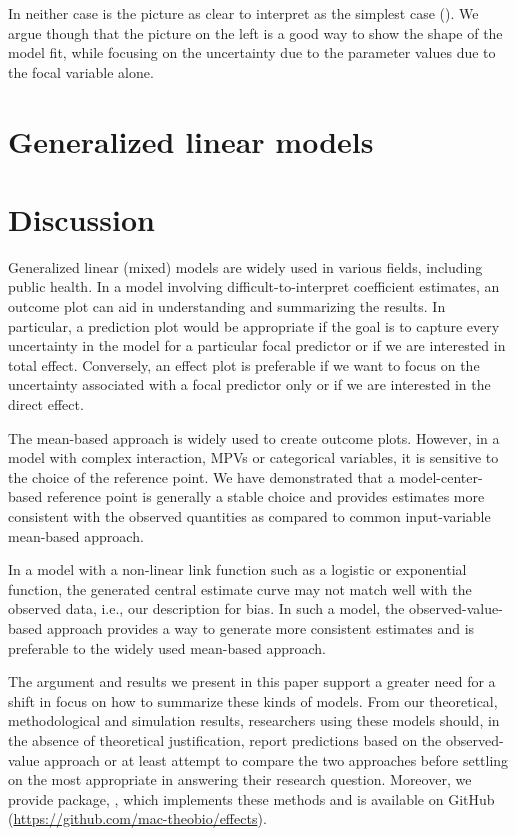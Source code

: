 In neither case is the picture as clear to interpret as the simplest case (). We argue though that the picture on the left is a good way to show the shape of the model fit, while focusing on the uncertainty due to the parameter values due to the focal variable alone.

\section{Generalized linear models}

\section{Discussion}

Generalized linear (mixed) models are widely used in various fields, including public health. In a model involving difficult-to-interpret coefficient estimates, an outcome plot can aid in understanding and summarizing the results. In particular, a prediction plot would be appropriate if the goal is to capture every uncertainty in the model for a particular focal predictor or if we are interested in total effect. Conversely, an effect plot is preferable if we want to focus on the uncertainty associated with a focal predictor only or if we are interested in the direct effect.

The mean-based approach is widely used to create outcome plots. However, in a model with complex interaction, MPVs or categorical variables, it is sensitive to the choice of the reference point. We have demonstrated that a model-center-based reference point is generally a stable choice and provides estimates more consistent with the observed quantities as compared to common input-variable mean-based approach.

In a model with a non-linear link function such as a logistic or exponential function, the generated central estimate curve may not match well with the observed data, i.e., our description for bias. In such a model, the observed-value-based approach provides a way to generate more consistent estimates and is preferable to the widely used mean-based approach.

The argument and results we present in this paper support a greater need for a shift in focus on how to summarize these kinds of models. From our theoretical, methodological and simulation results, researchers using these models should, in the absence of theoretical justification, report predictions based on the observed-value approach or at least attempt to compare the two approaches before settling on the most appropriate in answering their research question. Moreover, we provide  package, , which implements these methods and is available on GitHub (\href{https://github.com/mac-theobio/effects}{https://github.com/mac-theobio/effects}).

